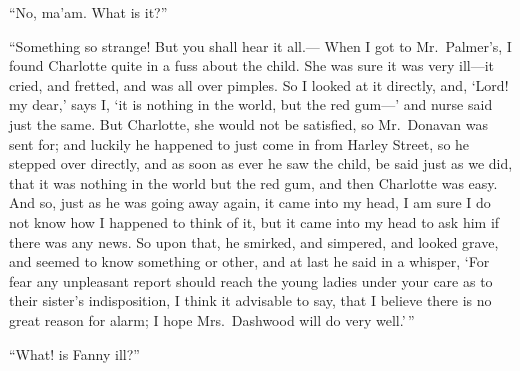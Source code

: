 ``No, ma'am.  What is it?''

``Something so strange!  But you shall hear it all.---%
When I got to Mr.\ Palmer's, I found Charlotte quite
in a fuss about the child.  She was sure it was very
ill---it cried, and fretted, and was all over pimples.
So I looked at it directly, and, `Lord! my dear,'
says I, `it is nothing in the world, but the red gum---'
and nurse said just the same.  But Charlotte, she would
not be satisfied, so Mr.\ Donavan was sent for; and luckily
he happened to just come in from Harley Street, so he
stepped over directly, and as soon as ever he saw the child,
be said just as we did, that it was nothing in the world
but the red gum, and then Charlotte was easy.  And so,
just as he was going away again, it came into my head,
I am sure I do not know how I happened to think of it,
but it came into my head to ask him if there was any news.
So upon that, he smirked, and simpered, and looked grave,
and seemed to know something or other, and at last he
said in a whisper, `For fear any unpleasant report
should reach the young ladies under your care as to their
sister's indisposition, I think it advisable to say,
that I believe there is no great reason for alarm; I hope
Mrs.\ Dashwood will do very well.'\,''

``What! is Fanny ill?''

